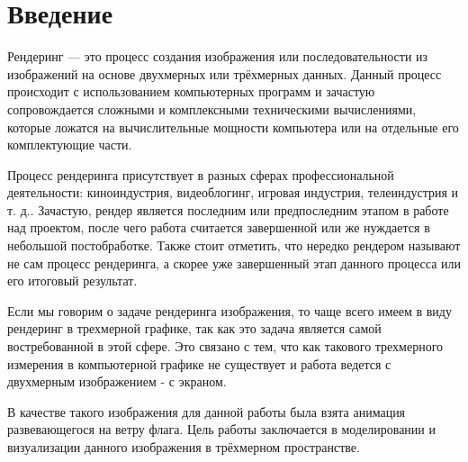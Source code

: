 \tableofcontents
	
\chapter*{Введение}

\vspace{-0.5cm}\hspace{0.6cm}Рендеринг — это процесс создания изображения или последовательности из изображений на основе двухмерных или трёхмерных данных. Данный процесс происходит с использованием компьютерных программ и зачастую сопровождается сложными и комплексными техническими вычислениями, которые ложатся на вычислительные мощности компьютера или на отдельные его комплектующие части.

\vspace{0.3cm}Процесс рендеринга присутствует в разных сферах профессиональной деятельности: киноиндустрия, видеоблогинг, игровая индустрия, телеиндустрия и т. д.. Зачастую, рендер является последним или предпоследним этапом в работе над проектом, после чего работа считается завершенной или же нуждается в небольшой постобработке. Также стоит отметить, что нередко рендером называют не сам процесс рендеринга, а скорее уже завершенный этап данного процесса или его итоговый результат\cite{web:render}.

\vspace{0.3cm}Если мы говорим о задаче рендеринга изображения, то чаще всего имеем в виду рендеринг в трехмерной графике, так как это задача является самой востребованной в этой сфере. Это связано с тем, что как такового трехмерного измерения в компьютерной графике не существует и работа ведется с двухмерным изображением - с экраном.

\vspace{0.3cm}В качестве такого изображения для данной работы была взята анимация развевающегося на ветру флага. Цель работы заключается в моделировании и визуализации данного изображения в трёхмерном пространстве.